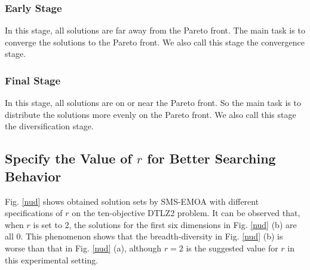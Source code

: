 \documentclass[conference]{IEEEtran}
\begin{document}
\subsubsection{Early Stage} In this stage, 
all solutions are far away from the Pareto front.
The main task is to converge the solutions to the Pareto front.
We also call this stage the convergence stage.
\subsubsection{Final Stage} In this stage,
all solutions are on or near the Pareto front. 
So the main task is to distribute the solutions more evenly on the Pareto front.
We also call this stage the diversification stage.

%
% 
\subsection{Specify the Value of $r$ for Better Searching Behavior}
Fig. \ref{nud} shows obtained solution sets by SMS-EMOA with different specifications of $r$ on the ten-objective DTLZ2 problem. 
It can be observed that, when $r$ is set to 2, the solutions for the first six dimensions in Fig. \ref{nud} (b) are all 0. 
This phenomenon shows that the breadth-diversity\cite{DtA} in Fig. \ref{nud} (b) is worse than that in Fig. \ref{nud} (a),
although $r=2$ is the suggested value for $r$ in this experimental setting. 
\end{document}
